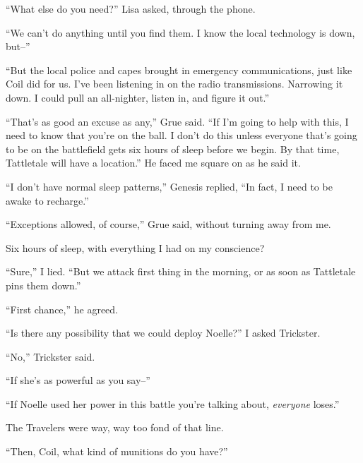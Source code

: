 ``What else do you need?'' Lisa asked, through the phone.



``We can't do anything until you find them.  I know the local technology is down, but--''



``But the local police and capes brought in emergency communications, just like Coil did for us.  I've been listening in on the radio transmissions.  Narrowing it down.  I could pull an all-nighter, listen in, and figure it out.''



``That's as good an excuse as any,'' Grue said.  ``If I'm going to help with this, I need to know that you're on the ball.  I don't do this unless everyone that's going to be on the battlefield gets six hours of sleep before we begin.  By that time, Tattletale will have a location.''  He faced me square on as he said it.



``I don't have normal sleep patterns,'' Genesis replied, ``In fact, I need to be awake to recharge.''



``Exceptions allowed, of course,'' Grue said, without turning away from me.



Six hours of sleep, with everything I had on my conscience?



``Sure,'' I lied.  ``But we attack first thing in the morning, or as soon as Tattletale pins them down.''



``First chance,'' he agreed.



``Is there any possibility that we could deploy Noelle?''  I asked Trickster.



``No,'' Trickster said.



``If she's as powerful as you say--''



``If Noelle used her power in this battle you're talking about, \emph{everyone} loses.''



The Travelers were way, way too fond of that line.



``Then, Coil, what kind of munitions do you have?''



